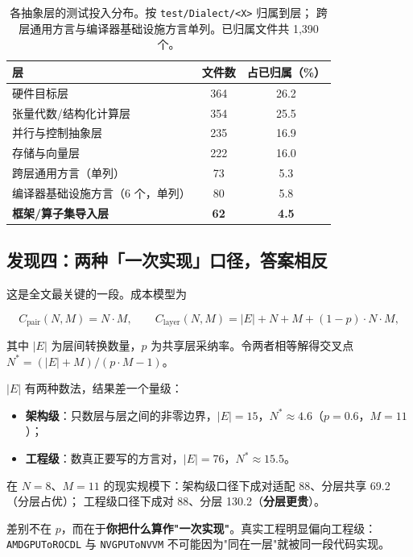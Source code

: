 \begin{table}[t]
  \caption{各抽象层的测试投入分布。按 \texttt{test/Dialect/<X>} 归属到层；
  跨层通用方言与编译器基础设施方言单列。已归属文件共 1{,}390 个。}
  \label{tab:investment}
  \small
  \begin{tabularx}{\linewidth}{@{}l S[table-format=3.0] S[table-format=2.1]@{}}
    \toprule
    层 & {文件数} & {占已归属（\%）} \\
    \midrule
    硬件目标层 & 364 & 26.2 \\
    张量代数/结构化计算层 & 354 & 25.5 \\
    并行与控制抽象层 & 235 & 16.9 \\
    存储与向量层 & 222 & 16.0 \\
    跨层通用方言（单列） & 73 & 5.3 \\
    编译器基础设施方言（6 个，单列） & 80 & 5.8 \\
    \textbf{框架/算子集导入层} & \textbf{62} & \textbf{4.5} \\
    \bottomrule
  \end{tabularx}
\end{table}


\subsection{发现四：两种「一次实现」口径，答案相反}

这是全文最关键的一段。成本模型为

\begin{equation}
  C_{\text{pair}}(N,M) = N\cdot M,\qquad
  C_{\text{layer}}(N,M) = |E| + N + M + (1-p)\cdot N\cdot M,
\end{equation}

其中 $|E|$ 为层间转换数量，$p$ 为共享层采纳率。令两者相等解得交叉点
$N^{*} = (|E|+M)/(p\cdot M - 1)$。

$|E|$ 有两种数法，结果差一个量级：

\begin{itemize}
  \item \textbf{架构级}：只数层与层之间的非零边界，$|E| = 15$，$N^{*}\approx 4.6$（$p=0.6$，$M=11$）；
  \item \textbf{工程级}：数真正要写的方言对，$|E| = 76$，$N^{*}\approx 15.5$。
\end{itemize}

在 $N=8$、$M=11$ 的现实规模下：架构级口径下成对适配 88、分层共享 69.2（分层占优）；
工程级口径下成对 88、分层 130.2（\textbf{分层更贵}）。

差别不在 $p$，而在于\textbf{你把什么算作"一次实现"}。真实工程明显偏向工程级：
\texttt{AMDGPUToROCDL} 与 \texttt{NVGPUToNVVM} 不可能因为"同在一层"就被同一段代码实现。

